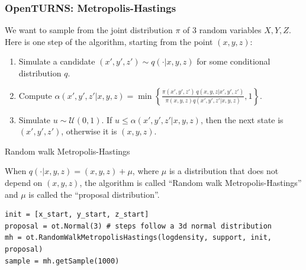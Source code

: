 \documentclass{beamer}
\begin{document}

\begin{frame}[containsverbatim]
\frametitle{OpenTURNS: Metropolis-Hastings}
\small
We want to sample from the joint distribution $\pi$ of 3 random variables $X, Y, Z$.
Here is one step of the algorithm, starting from the point $(x, y, z)$:

\begin{enumerate}
\item Simulate a candidate $(x',y',z') \sim q( \cdot | x, y, z)$ for some conditional distribution $q$.
\item Compute
$
\alpha(x',y',z' | x,y,z) = \min \left\{ \frac{\pi(x',y',z') \, q(x,y,z | x',y',z')}{\pi(x,y,z) q(x',y',z' | x,y,z)} , 1 \right\}.
$
\item Simulate $u \sim \mathcal{U}(0,1)$. If $u \leqslant \alpha(x',y',z' | x,y,z)$,
then the next state is $(x',y',z')$, otherwise it is $(x,y,z)$.
\end{enumerate}

\begin{block}{Random walk Metropolis-Hastings}

When $q(\cdot | x, y, z) = (x,y,z) + \mu$, where $\mu$ is a distribution that does not depend on $(x,y,z)$,
the  algorithm is called ``Random walk Metropolis-Hastings'' and $\mu$ is called the ``proposal distribution''.

\begin{lstlisting}
init = [x_start, y_start, z_start]
proposal = ot.Normal(3) # steps follow a 3d normal distribution
mh = ot.RandomWalkMetropolisHastings(logdensity, support, init, proposal)
sample = mh.getSample(1000)
\end{lstlisting}
\end{block}

\end{frame}
\end{document}

